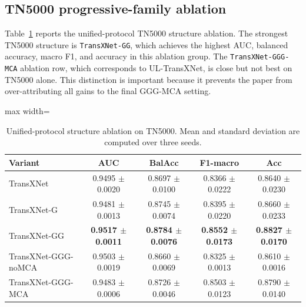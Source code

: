 \subsection{TN5000 progressive-family ablation}
Table~\ref{tab:tn5000_structure_ablation} reports the unified-protocol TN5000 structure ablation. The strongest TN5000 structure is \texttt{TransXNet-GG}, which achieves the highest AUC, balanced accuracy, macro F1, and accuracy in this ablation group. The \texttt{TransXNet-GGG-MCA} ablation row, which corresponds to UL-TransXNet, is close but not best on TN5000 alone. This distinction is important because it prevents the paper from over-attributing all gains to the final GGG-MCA setting.

\begin{table}[t]
    \centering
    \small
    \caption{Unified-protocol structure ablation on TN5000. Mean and standard deviation are computed over three seeds.}
    \label{tab:tn5000_structure_ablation}
    \begin{adjustbox}{max width=\columnwidth}
    \begin{tabular}{lcccc}
        \toprule
        Variant & AUC & BalAcc & F1-macro & Acc \\
        \midrule
        TransXNet & 0.9495 $\pm$ 0.0020 & 0.8697 $\pm$ 0.0100 & 0.8366 $\pm$ 0.0222 & 0.8640 $\pm$ 0.0230 \\
        TransXNet-G & 0.9481 $\pm$ 0.0013 & 0.8745 $\pm$ 0.0074 & 0.8395 $\pm$ 0.0220 & 0.8660 $\pm$ 0.0233 \\
        TransXNet-GG & \textbf{0.9517 $\pm$ 0.0011} & \textbf{0.8784 $\pm$ 0.0076} & \textbf{0.8552 $\pm$ 0.0173} & \textbf{0.8827 $\pm$ 0.0170} \\
        TransXNet-GGG-noMCA & 0.9503 $\pm$ 0.0019 & 0.8660 $\pm$ 0.0069 & 0.8325 $\pm$ 0.0013 & 0.8610 $\pm$ 0.0016 \\
        TransXNet-GGG-MCA & 0.9483 $\pm$ 0.0006 & 0.8726 $\pm$ 0.0046 & 0.8503 $\pm$ 0.0123 & 0.8790 $\pm$ 0.0140 \\
        \bottomrule
    \end{tabular}
    \end{adjustbox}
\end{table}

